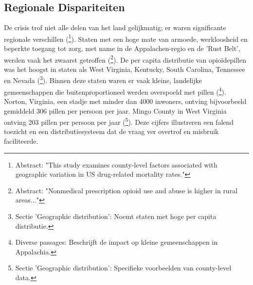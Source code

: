 \documentclass[11pt, a4paper]{report} %
\begin{document}
\subsection{Regionale Dispariteiten}
De crisis trof niet alle delen van het land gelijkmatig; er waren significante regionale verschillen (\cite{Monnat2018FactorsCountyLevelDrugMortality}\footnote{Abstract: "This study examines county-level factors associated with geographic variation in US drug-related mortality rates."}). Staten met een hoge mate van armoede, werkloosheid en beperkte toegang tot zorg, met name in de Appalachen-regio en de 'Rust Belt', werden vaak het zwaarst getroffen (\cite{Keyes2014RuralUrbanOpioidUse}\footnote{Abstract: "Nonmedical prescription opioid use and abuse is higher in rural areas..."}). De per capita distributie van opioïdepillen was het hoogst in staten als West Virginia, Kentucky, South Carolina, Tennessee en Nevada (\cite{WikipediaOpioidEpidemicUS}\footnote{Sectie 'Geographic distribution': Noemt staten met hoge per capita distributie.}). Binnen deze staten waren er vaak kleine, landelijke gemeenschappen die buitenproportioneel werden overspoeld met pillen (\cite{Macy2018Dopesick}\footnote{Diverse passages: Beschrijft de impact op kleine gemeenschappen in Appalachia.}). Norton, Virginia, een stadje met minder dan 4000 inwoners, ontving bijvoorbeeld gemiddeld 306 pillen per persoon per jaar. Mingo County in West Virginia ontving 203 pillen per persoon per jaar (\cite{WikipediaOpioidEpidemicUS}\footnote{Sectie 'Geographic distribution': Specifieke voorbeelden van county-level data.}). Deze cijfers illustreren een falend toezicht en een distributiesysteem dat de vraag ver overtrof en misbruik faciliteerde.
\end{document}
